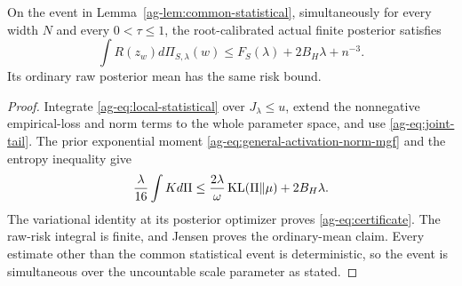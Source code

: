 \begin{theorem}
\label{ag-thm:certificate}
On the event in Lemma~\ref{ag-lem:common-statistical}, simultaneously for every width $N$ and every $0<\tau\le1$, the root-calibrated actual finite posterior satisfies
\begin{equation}
 \int R(z_w)d\Pi_{S,\lambda}(w)
 \le F_S(\lambda)+2B_H\lambda+n^{-3}.
 \label{ag-eq:certificate}
\end{equation}
Its ordinary raw posterior mean has the same risk bound.
\end{theorem}
\begin{proof}
Integrate \eqref{ag-eq:local-statistical} over $J_\lambda\le u$, extend the nonnegative empirical-loss and norm terms to the whole parameter space, and use \eqref{ag-eq:joint-tail}. The prior exponential moment \eqref{ag-eq:general-activation-norm-mgf} and the entropy inequality give
\[
 \frac{\lambda}{16}\int Kd\Pi
 \le\frac{2\lambda}{\omega}\operatorname{KL}(\Pi\Vert\mu)+2B_H\lambda.
\]
The variational identity at its posterior optimizer proves \eqref{ag-eq:certificate}. The raw-risk integral is finite, and Jensen proves the ordinary-mean claim. Every estimate other than the common statistical event is deterministic, so the event is simultaneous over the uncountable scale parameter as stated.
\end{proof}
